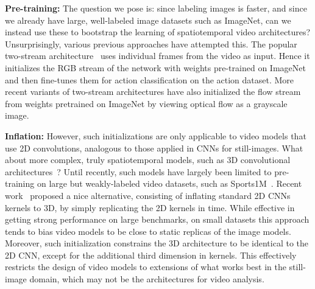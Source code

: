 \documentclass[10pt,twocolumn,letterpaper]{article}
\begin{document}
{\noindent \bf Pre-training:} The question we pose is: since labeling images is faster, and since we already have large, well-labeled image datasets such as ImageNet, can we instead use
these to bootstrap the learning of spatiotemporal video architectures? Unsurprisingly, various previous approaches have attempted this. The popular
two-stream architecture~\cite{Simonyan_14b} uses individual frames from the video as input. Hence it initializes the 
RGB stream of the network with
 weights pre-trained on ImageNet and then fine-tunes them for action classification on the action dataset. More recent variants of
two-stream architectures have also initialized the flow stream~\cite{WangL_16a} from weights pretrained on ImageNet by viewing  optical flow as a grayscale image.

{\noindent \bf Inflation:} However, such initializations are only applicable to video models that use 2D convolutions, analogous to those applied in CNNs for still-images. 
What about more complex, truly spatiotemporal models, such as 3D convolutional architectures~\cite{Tran_15}?
Until recently, such models have largely been limited to pre-training on large but weakly-labeled video datasets, such as Sports1M~\cite{Karpathy_14}.
Recent work~\cite{carreira2017quo,Feichtenhofer_16b} proposed a nice alternative, consisting of inflating standard 2D CNNs kernels to 3D, by simply replicating the 2D kernels in time. While effective in getting strong performance on large benchmarks, on small datasets this approach tends to bias video models to be close to static replicas of the image models. 
Moreover, such initialization constrains the 3D architecture to be identical to the 2D CNN, except for the additional third dimension in kernels. This effectively restricts the design of video models to 
extensions of what
works best in the still-image domain,
which may not be the architectures for video analysis.
\end{document}
